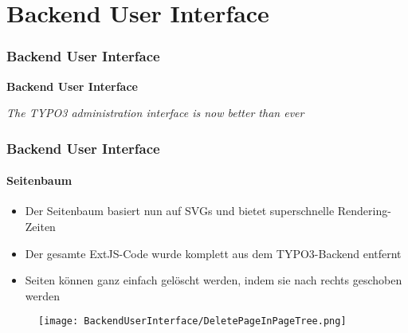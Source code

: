 %

\section{Backend User Interface}
\begin{frame}[fragile]
	\frametitle{Backend User Interface}

	\begin{center}\huge{\color{typo3darkgrey}\textbf{Backend User Interface}}\end{center}
	\begin{center}\large{\textit{The TYPO3 administration interface is now better than ever}}\end{center}

\end{frame}


\begin{frame}[fragile]
	\frametitle{Backend User Interface}
	\framesubtitle{Seitenbaum}

	\begin{itemize}
		\item Der Seitenbaum basiert nun auf SVGs und bietet superschnelle Rendering-Zeiten
		\item Der gesamte ExtJS-Code wurde komplett aus dem TYPO3-Backend entfernt
		\item Seiten können ganz einfach gelöscht werden, indem sie nach rechts geschoben werden
	\end{itemize}

	\begin{figure}
		\texttt{[image: BackendUserInterface/DeletePageInPageTree.png]}
	\end{figure}

\end{frame}


